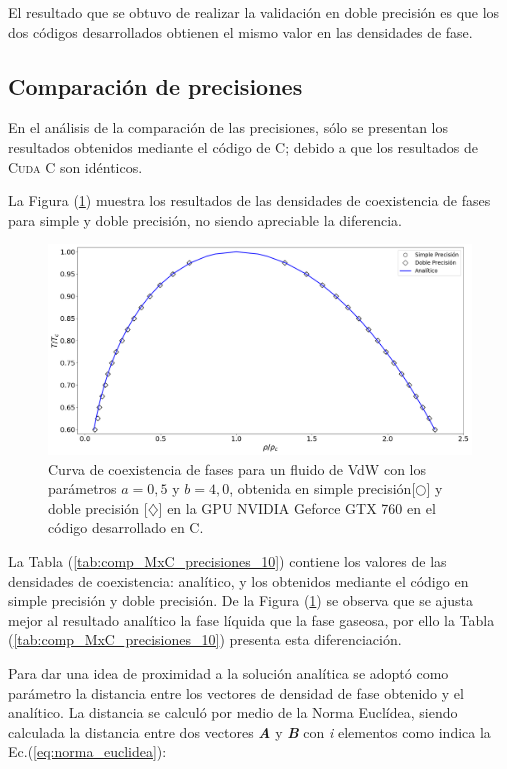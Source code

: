 El resultado que se obtuvo de realizar la validación en doble precisión es que los dos códigos desarrollados obtienen el mismo valor en las densidades de fase.

\newpage
\subsection{Comparación de precisiones}

En el análisis de la comparación de las precisiones, sólo se presentan los resultados obtenidos mediante el código de \textsc{C}; debido a que los resultados de \textsc{Cuda C} son idénticos.

La Figura (\ref{fig:v_760_MxC_c_comparacion}) muestra los resultados de las densidades de coexistencia de fases para simple y doble precisión, no siendo apreciable la diferencia.

\begin{figure}[htbp]
	\centering
	\includegraphics[width=\textwidth]{figs/cap4/v_760_MxC_c_comparacion}
	\caption{Curva de coexistencia de fases para un fluido de VdW con los parámetros $a = 0,5 $ y $b = 4,0 $, obtenida en simple precisión[$\bigcirc$] y doble precisión [$\diamondsuit$] en la GPU NVIDIA Geforce GTX 760 en el código desarrollado en \textsc{C}.} 
	\label{fig:v_760_MxC_c_comparacion}	
\end{figure}


La Tabla (\ref{tab:comp_MxC_precisiones_10}) contiene los valores de las densidades de coexistencia: analítico, y los obtenidos mediante el código en simple precisión y doble precisión. De la Figura (\ref{fig:v_760_MxC_c_comparacion}) se observa que se ajusta mejor al resultado analítico la fase líquida que la fase gaseosa, por ello la Tabla (\ref{tab:comp_MxC_precisiones_10}) presenta esta diferenciación.

Para dar una idea de proximidad a la solución analítica se adoptó como parámetro la distancia entre los vectores de densidad de fase obtenido y el analítico. La distancia se calculó por medio de la Norma Euclídea, siendo calculada la distancia entre dos vectores \textbf{\textit{A}} y \textbf{\textit{B}} con \textit{i} elementos como indica la Ec.(\ref{eq:norma_euclidea}):

